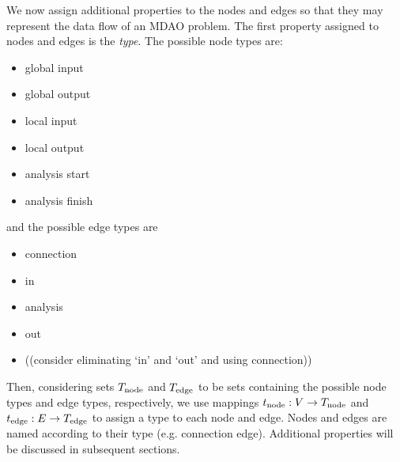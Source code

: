 We now assign additional properties to the nodes and edges so that they may represent the data flow of an MDAO problem. 
The first property assigned to nodes and edges is the \emph{type}. The possible node types are:
\begin{itemize}
\item global input
\item global output
\item local input
\item local output
\item analysis start
\item analysis finish
\end{itemize}
and the possible edge types are
\begin{itemize}
\item connection
\item in
\item analysis
\item out
\item ((consider eliminating `in' and `out' and using connection))
\end{itemize}
Then, considering sets $T_\textrm{node}$ and $T_\textrm{edge}$ to be sets containing the possible node types and edge types, respectively, we use mappings $t_\textrm{node}:V \to T_\textrm{node}$ and $t_\textrm{edge}:E \to T_\textrm{edge}$ to assign a type to each node and edge. Nodes and edges are named according to their type (e.g. connection edge). Additional properties will be discussed in subsequent sections.

